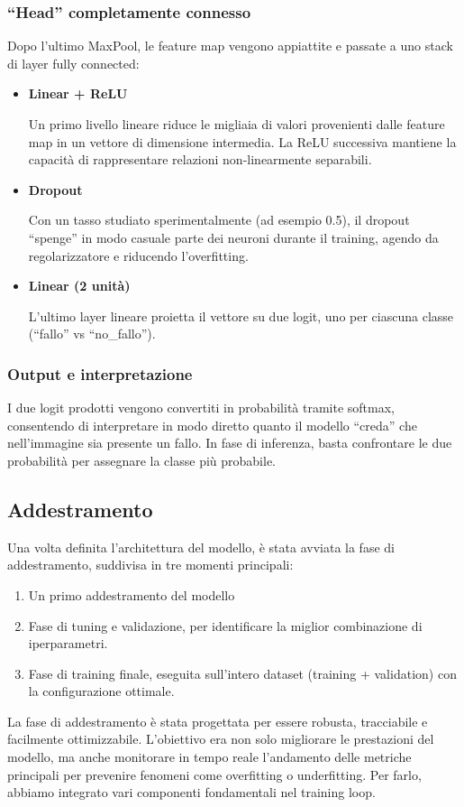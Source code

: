 \documentclass[main.tex]{subfiles}
\begin{document}
\subsubsection*{“Head” completamente connesso}

 Dopo l’ultimo MaxPool, le feature map vengono appiattite e passate a uno stack di layer fully connected:

\begin{itemize}
    \item \textbf{Linear + ReLU}

 Un primo livello lineare riduce le migliaia di valori provenienti dalle feature map in un vettore di dimensione intermedia. La ReLU successiva mantiene la capacità di rappresentare relazioni non-linearmente separabili.

    \item \textbf{Dropout}

 Con un tasso studiato sperimentalmente (ad esempio 0.5), il dropout “spenge” in modo casuale parte dei neuroni durante il training, agendo da regolarizzatore e riducendo l’overfitting.

    \item \textbf{Linear (2 unità)}

 L’ultimo layer lineare proietta il vettore su due logit, uno per ciascuna classe (“fallo” vs “no\_fallo”).

\end{itemize}
\subsubsection*{Output e interpretazione}

 I due logit prodotti vengono convertiti in probabilità tramite softmax, consentendo di interpretare in modo diretto quanto il modello “creda” che nell’immagine sia presente un fallo. In fase di inferenza, basta confrontare le due probabilità per assegnare la classe più probabile.

\subsection{Addestramento}

Una volta definita l'architettura del modello, è stata avviata la fase di addestramento, suddivisa in tre momenti principali:

\begin{enumerate}
    \item Un primo addestramento del modello
    \item Fase di tuning e validazione, per identificare la miglior combinazione di iperparametri.
    \item Fase di training finale, eseguita sull'intero dataset (training + validation) con la configurazione ottimale.
\end{enumerate}
La fase di addestramento è stata progettata per essere robusta, tracciabile e facilmente ottimizzabile. L’obiettivo era non solo migliorare le prestazioni del modello, ma anche monitorare in tempo reale l’andamento delle metriche principali per prevenire fenomeni come overfitting o underfitting. Per farlo, abbiamo integrato vari componenti fondamentali nel training loop.
\end{document}
